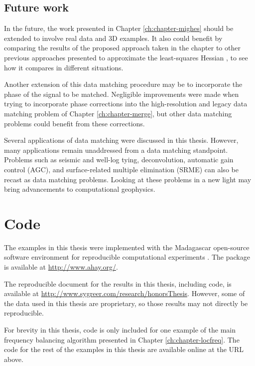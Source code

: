 \subsection{Future work}
In the future, the work presented in Chapter \ref{ch:chapter-mighes} should be extended to involve real data and 3D examples. 
It also could benefit by comparing the results of the proposed approach taken in the chapter to other previous approaches presented to approximate the least-squares Hessian \cite[]{migdec,lsamp,siklsm,pwlsrtm,diagamp,debfilt,prestack,poststack}, to see how it compares in different situations.

Another extension of this data matching procedure may be to incorporate
the phase of the signal to be matched. 
Negligible improvements were made when trying to incorporate phase corrections into the high-resolution and legacy data matching problem of Chapter \ref{ch:chapter-merge}, but other data matching problems could benefit from these corrections.

Several applications of data matching were discussed in this thesis. 
However, many applications remain unaddressed from a data matching standpoint. 
Problems such as seismic and well-log tying, deconvolution, automatic gain control (AGC), and surface-related multiple elimination (SRME) can also be recast as data matching problems. Looking at these problems in a new light may bring advancements to computational geophysics.

\appendix
\section{Code}
The examples in this thesis were implemented with the Madagascar open-source software environment for reproducible computational experiments \cite[]{madagascar}.
The package is available at \url{http://www.ahay.org/}.

The reproducible document for the results in this thesis, including code, is available at \url{http://www.sygreer.com/research/honorsThesis}.
However, some of the data used in this thesis are proprietary, so those results may not directly be reproducible.

For brevity in this thesis, code is only included for one example of the main frequency balancing algorithm presented in Chapter \ref{ch:chapter-locfreq}.
The code for the rest of the examples in this thesis are available online at the URL above.

